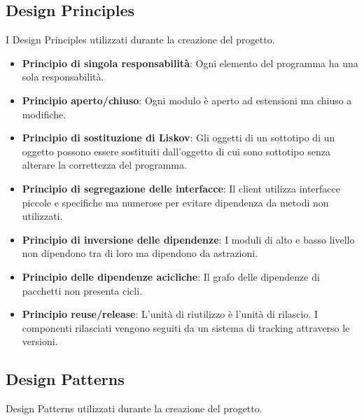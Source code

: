 \documentclass[12pt]{article}
\begin{document}
\subsection{Design Principles}
I Design Principles utilizzati durante la creazione del progetto.
\begin{itemize}
	\item \textbf{Principio di singola responsabilità}: Ogni elemento del programma ha una sola responsabilità.
	\item \textbf{Principio aperto/chiuso}: Ogni modulo è aperto ad estensioni ma chiuso a modifiche.
	\item \textbf{Principio di sostituzione di Liskov}: Gli oggetti di un sottotipo di un oggetto possono essere sostituiti dall'oggetto di cui sono sottotipo senza alterare la correttezza del programma.
	\item \textbf{Principio di segregazione delle interfacce}: Il client utilizza interfacce piccole e specifiche ma numerose per evitare dipendenza da metodi non utilizzati.
	\item \textbf{Principio di inversione delle dipendenze}: I moduli di alto e basso livello non dipendono tra di loro ma dipendono da astrazioni.
	\item \textbf{Principio delle dipendenze acicliche}: Il grafo delle dipendenze di pacchetti non presenta cicli.
	\item \textbf{Principio reuse/release}: L'unità di riutilizzo è l'unità di rilascio. I componenti rilasciati vengono seguiti da un sistema di tracking attraverso le versioni.
\end{itemize}
\subsection{Design Patterns}
Design Patterns utilizzati durante la creazione del progetto.
\end{document}
